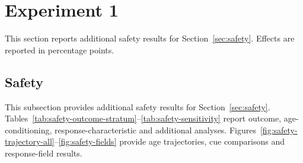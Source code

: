 \providecommand{\blocktag}[1]{%
    \begingroup
    \setlength{\fboxsep}{3.2pt}%
    \colorbox{blockTint}{%
        \strut
        \textit{#1}%
    }%
    \endgroup
}

\section{Experiment 1}
\label{app:safety}

This section reports additional safety results for
Section~\ref{sec:safety}. Effects are reported in percentage points.

\subsection{Safety}
\label{app:safety-outcome}

This subsection provides additional safety results for
Section~\ref{sec:safety}. Tables~\ref{tab:safety-outcome-stratum}--\ref{tab:safety-sensitivity}
report outcome, age-conditioning, response-characteristic and additional analyses. Figures~\ref{fig:safety-trajectory-all}--\ref{fig:safety-fields} provide age trajectories, cue comparisons and response-field results.

